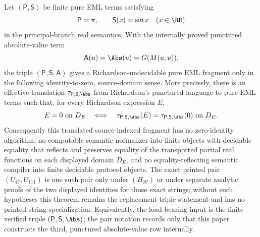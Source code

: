 \begin{theorem}
\label{thm:verified-pair-richardson-instantiation}
\label{thm:verified-replacement-richardson-instantiation}
Let \((\mathsf P,\mathsf S)\) be finite pure EML terms satisfying
\[
  \mathsf P=\pi,
  \qquad \mathsf S(x)=\sin x\quad(x\in\RR)
\]
in the principal-branch real semantics.  With the internally proved punctured
absolute-value term
\[
  \mathsf A(u)=\Abs(u)=G(M(u,u)),
\]
the triple \((\mathsf P,\mathsf S,\mathsf A)\) gives a Richardson-undecidable pure
EML fragment only in the following identity-to-zero, source-domain sense.  More
precisely, there is an effective translation
\(\tau_{\mathsf P,\mathsf S,\Abs}\) from Richardson's punctured language to pure
EML terms such that, for every Richardson expression \(E\),
\[
  E=0\hbox{ on }D_E
  \quad\Longleftrightarrow\quad
  \tau_{\mathsf P,\mathsf S,\Abs}(E)=
  \tau_{\mathsf P,\mathsf S,\Abs}(0)
  \hbox{ on }D_E .
\]
Consequently this translated source-indexed fragment has no zero-identity
algorithm, no computable semantic normalizer into finite objects with decidable
equality that reflects and preserves equality of the transported partial real
functions on each displayed domain \(D_E\), and no equality-reflecting semantic
compiler into finite decidable protocol objects.  The exact printed pair
\((U_{47},U_{111})\) is one such pair only under \((H_{\mathcal W})\) or under
separate analytic proofs of the two displayed identities for those exact strings;
without such hypotheses this theorem remains the replacement-triple statement and
has no printed-string specialization.  Equivalently, the load-bearing input is
the finite verified triple \((\mathsf P,\mathsf S,\Abs)\); the pair notation records
only that this paper constructs the third, punctured absolute-value row
internally.
\end{theorem}

